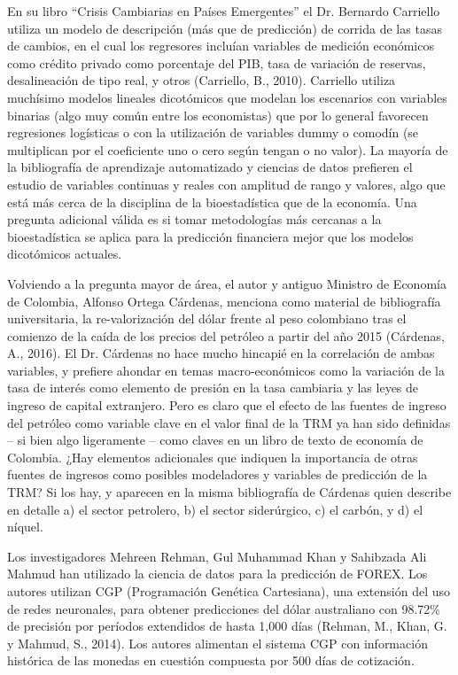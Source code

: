 En su libro “Crisis Cambiarias en Países Emergentes” el Dr. Bernardo Carriello utiliza un modelo de descripción (más que de predicción) de corrida de las tasas de cambios, en el cual los regresores incluían variables de medición económicos como crédito privado como porcentaje del PIB, tasa de variación de reservas, desalineación de tipo real, y otros (Carriello, B., 2010). Carriello utiliza muchísimo modelos lineales dicotómicos que modelan los escenarios con variables binarias (algo muy común entre los economistas) que por lo general favorecen regresiones logísticas o con la utilización de variables dummy o comodín (se multiplican por el coeficiente uno o cero según tengan o no valor). La mayoría de la bibliografía de aprendizaje automatizado y ciencias de datos prefieren el estudio de variables continuas y reales con amplitud de rango y valores, algo que está más cerca de la disciplina de la bioestadística que de la economía. Una pregunta adicional válida es si tomar metodologías más cercanas a la bioestadística se aplica para la predicción financiera mejor que los modelos dicotómicos actuales.
 
Volviendo a la pregunta mayor de área, el autor y antiguo Ministro de Economía de Colombia, Alfonso Ortega Cárdenas, menciona como material de bibliografía universitaria, la re-valorización del dólar frente al peso colombiano tras el comienzo de la caída de los precios del petróleo a partir del año 2015 (Cárdenas, A., 2016). El Dr. Cárdenas no hace mucho hincapié en la correlación de ambas variables, y prefiere ahondar en temas macro-económicos como la variación de la tasa de interés como elemento de presión en la tasa cambiaria y las leyes de ingreso de capital extranjero. Pero es claro que el efecto de las fuentes de ingreso del petróleo como variable clave en el valor final de la TRM ya han sido definidas – si bien algo ligeramente – como claves en un libro de texto de economía de Colombia. ¿Hay elementos adicionales que indiquen la importancia de otras fuentes de ingresos como posibles modeladores y variables de predicción de la TRM? Si los hay, y aparecen en la misma bibliografía de Cárdenas quien describe en detalle a) el sector petrolero, b) el sector siderúrgico, c) el carbón, y d) el níquel.
 
Los investigadores Mehreen Rehman, Gul Muhammad Khan y Sahibzada Ali Mahmud han utilizado la ciencia de datos para la predicción de FOREX. Los autores utilizan CGP (Programación Genética Cartesiana), una extensión del uso de redes neuronales, para obtener predicciones del dólar australiano con 98.72\% de precisión por períodos extendidos de hasta 1,000 días (Rehman, M., Khan, G. y Mahmud, S., 2014). Los autores alimentan el sistema CGP con información histórica de las monedas en cuestión compuesta por 500 días de cotización.
 
